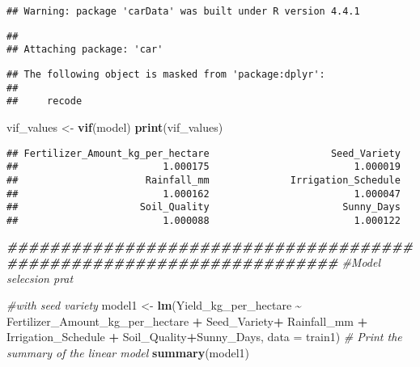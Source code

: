 \documentclass[
]{article}
\newenvironment{Shaded}{\begin{snugshade}}{\end{snugshade}}
\newcommand{\AttributeTok}[1]{\textcolor[rgb]{0.13,0.29,0.53}{#1}}
\newcommand{\CommentTok}[1]{\textcolor[rgb]{0.56,0.35,0.01}{\textit{#1}}}
\newcommand{\DocumentationTok}[1]{\textcolor[rgb]{0.56,0.35,0.01}{\textbf{\textit{#1}}}}
\newcommand{\FunctionTok}[1]{\textcolor[rgb]{0.13,0.29,0.53}{\textbf{#1}}}
\newcommand{\NormalTok}[1]{#1}
\newcommand{\OtherTok}[1]{\textcolor[rgb]{0.56,0.35,0.01}{#1}}
\newcommand{\SpecialCharTok}[1]{\textcolor[rgb]{0.81,0.36,0.00}{\textbf{#1}}}
\begin{document}
\begin{verbatim}
## Warning: package 'carData' was built under R version 4.4.1
\end{verbatim}

\begin{verbatim}
## 
## Attaching package: 'car'
\end{verbatim}

\begin{verbatim}
## The following object is masked from 'package:dplyr':
## 
##     recode
\end{verbatim}

\begin{Shaded}
\begin{Highlighting}[]
\NormalTok{vif\_values }\OtherTok{\textless{}{-}} \FunctionTok{vif}\NormalTok{(model)}
\FunctionTok{print}\NormalTok{(vif\_values)}
\end{Highlighting}
\end{Shaded}

\begin{verbatim}
## Fertilizer_Amount_kg_per_hectare                     Seed_Variety 
##                         1.000175                         1.000019 
##                      Rainfall_mm              Irrigation_Schedule 
##                         1.000162                         1.000047 
##                     Soil_Quality                       Sunny_Days 
##                         1.000088                         1.000122
\end{verbatim}

\begin{Shaded}
\begin{Highlighting}[]
\DocumentationTok{\#\#\#\#\#\#\#\#\#\#\#\#\#\#\#\#\#\#\#\#\#\#\#\#\#\#\#\#\#\#\#\#\#\#\#\#\#\#\#\#\#\#\#\#\#\#\#\#\#\#\#\#\#\#\#\#\#\#\#\#\#\#\#\#\#\#\#\#\#}
\CommentTok{\#Model selecsion  prat}

\CommentTok{\#with seed variety}
\NormalTok{model1 }\OtherTok{\textless{}{-}} \FunctionTok{lm}\NormalTok{(Yield\_kg\_per\_hectare }\SpecialCharTok{\textasciitilde{}}\NormalTok{ Fertilizer\_Amount\_kg\_per\_hectare }\SpecialCharTok{+}\NormalTok{ Seed\_Variety}\SpecialCharTok{+}\NormalTok{ Rainfall\_mm }\SpecialCharTok{+}\NormalTok{ Irrigation\_Schedule }\SpecialCharTok{+}\NormalTok{ Soil\_Quality}\SpecialCharTok{+}\NormalTok{Sunny\_Days, }\AttributeTok{data =}\NormalTok{ train1)}
\CommentTok{\# Print the summary of the linear model}
\FunctionTok{summary}\NormalTok{(model1)}
\end{Highlighting}
\end{Shaded}
\end{document}
